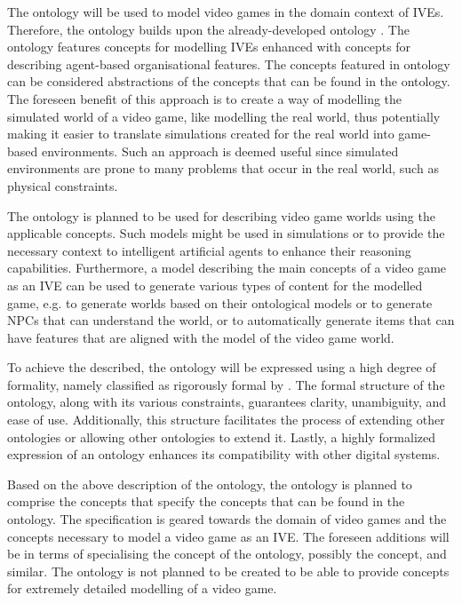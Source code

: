 The \given ontology will be used
%
to model video games in the domain context of \acp{IVE}. Therefore, the \given ontology builds upon the already-developed \mambo ontology \cite{okresaduric2019MAMbO5NewOntology}. The \mambo ontology features concepts for modelling \acp{IVE} enhanced with concepts for describing agent-based organisational features. The concepts featured in \mambo ontology can be considered abstractions of the concepts that can be found in the \given ontology. The foreseen benefit of this approach is to create a way of modelling the simulated world of a video game, like modelling the real world, thus potentially making it easier to translate simulations created for the real world into game-based environments. Such an approach is deemed useful since simulated environments are prone to many problems that occur in the real world, such as physical constraints.

The \given ontology is planned to be used
%
for describing video game worlds using the applicable concepts. Such models might be used in simulations or to provide the necessary context to intelligent artificial agents to enhance their reasoning capabilities. Furthermore, a model describing the main concepts of a video game as an \ac{IVE} can be used to generate various types of content for the modelled game, e.g. to generate worlds based on their ontological models or to generate \acp{NPC} that can understand the world, or to automatically generate items that can have features that are aligned with the model of the video game world.

To achieve the described, the \given ontology will be expressed using a high degree of formality, namely classified as rigorously formal by \cite{uschold1996OntologiesPrinciplesMethods}.
%
The formal structure of the ontology, along with its various constraints, guarantees clarity, unambiguity, and ease of use. Additionally, this structure facilitates the process of extending other ontologies or allowing other ontologies to extend it. Lastly, a highly formalized expression of an ontology enhances its compatibility with other digital systems.

Based on the above description of the \given ontology, the ontology is planned to comprise the concepts
%
that specify the concepts that can be found in the \mambo ontology. The specification is geared towards the domain of video games and the concepts necessary to model a video game as an \ac{IVE}. The foreseen additions will be in terms of specialising the  concept of the \mambo ontology, possibly the  concept, and similar. The \given ontology is not planned to be created to be able to provide concepts for extremely detailed modelling of a video game.

